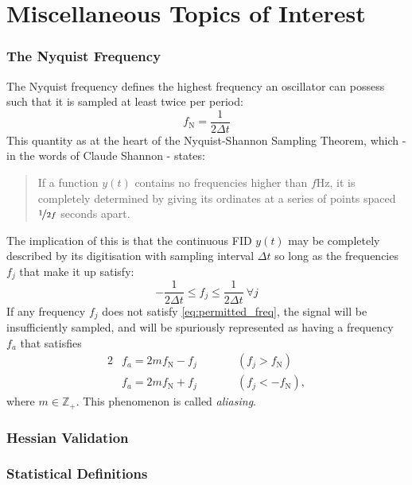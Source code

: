 \chapter{Miscellaneous Topics of Interest}
\label{chap:misc}

\subsection{The Nyquist Frequency}
\label{sec:nyquist}
The Nyquist frequency defines the highest frequency an oscillator can possess
such that it is sampled at least twice per period:
\begin{equation}
  f_{\mathrm{N}} = \frac{1}{2\Delta t}
\end{equation}
This quantity as at the heart of the Nyquist-Shannon Sampling Theorem, which -
in the words of Claude Shannon\cite{Shannon1949} - states:
\begin{quote}
  If a function $y(t)$ contains no frequencies
  higher than $f \si{\hertz}$, it is completely determined by giving
  its ordinates at a series of points spaced $\nicefrac{1}{2f}$ seconds
  apart.
\end{quote}
The implication of this is that the continuous FID $y(t)$ may be completely
described by its digitisation with sampling interval $\Delta t$ so long as the
frequencies $f_j$ that make it up satisfy:
\begin{equation}
  \label{permitted_freq}
  -\frac{1}{2\Delta t} \leq f_j \leq \frac{1}{2\Delta t}\ \forall j
\end{equation}
If any frequency $f_j$ does not satisfy \eqref{eq:permitted_freq}, the signal
will be insufficiently sampled, and will be spuriously represented as having a
frequency $f_a$ that satisfies
\begin{alignat}{2}
  &f_a = 2mf_{\mathrm{N}} - f_j \quad \quad &&(f_j > f_{\mathrm{N}})\\
  &f_a = 2mf_{\mathrm{N}} + f_j \quad \quad &&(f_j < -f_{\mathrm{N}}),
\end{alignat}
where $m \in \mathbb{Z}_+$. This phenomenon is called \textit{aliasing}.

\subsection{Hessian Validation}

\subsection{Statistical Definitions}
